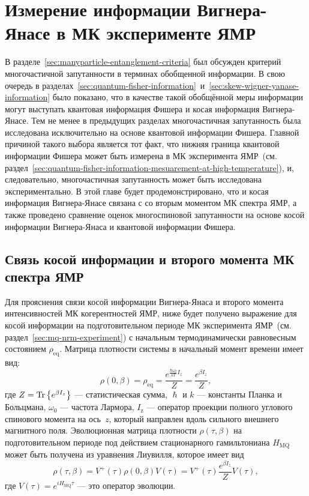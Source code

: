 \chapter{Измерение информации Вигнера-Янасе в МК эксперименте ЯМР}
\label{chapter:wyi-mesuarement}


В разделе~\ref{sec:manyparticle-entanglement-criteria} был обсужден критерий многочастичной запутанности
в терминах обобщенной информации.
В свою очередь в разделах~\ref{sec:quantum-fisher-information}~и~\ref{sec:skew-wigner-yanase-information}
было показано,
что в качестве такой обобщённой меры информации могут выступать
квантовая информация Фишера и косая информация Вигнера-Янасе.
Тем не менее в предыдущих разделах многочастичная запутанность была исследована исключительно
на основе квантовой информации Фишера.
Главной причиной такого выбора является тот факт,
что нижняя граница квантовой информации Фишера может быть измерена в МК эксперимента ЯМР~(см.  раздел~\ref{sec:quantum-fisher-information-mesuarement-at-high-temperature}),
и, следовательно, многочастичная запутанность может быть исследована экспериментально.
В этой главе будет продемонстрировано,
что и косая информация Вигнера-Янасе связана с
со вторым моментом МК спектра ЯМР,
а также проведено сравнение оценок многоспиновой запутанности
на основе косой информации Вигнера-Янаса и квантовой информации Фишера.



\section{Связь косой информации и второго момента МК спектра ЯМР}
\label{sec:wyi-mesuarement}

Для прояснения связи косой информации Вигнера-Янаса и
второго момента интенсивностей МК когерентностей ЯМР,
ниже будет получено выражение для косой информации
на подготовительном периоде МК эксперимента ЯМР~(см. раздел~\ref{sec:mq-nrm-experiment})
с начальным термодинамически равновесным состоянием $\rho_\mathrm{eq}$.
Матрица плотности системы в начальный момент времени имеет вид:
\begin{equation}
  \rho(0, \beta)
  = \rho_\mathrm{eq}
  = \dfrac{e^{\frac{\hbar\omega_{0}}{kT} I_z}}{Z}
  = \dfrac{e^{\beta I_z}}{Z},
\end{equation}
где $Z = \mathrm{Tr} \left\{ e^{\beta I_z} \right\}$ --- статистическая сумма,
$\hslash$ и $k$ --- константы Планка и Больцмана,
$\omega_{0}$ --- частота Лармора,
$I_\mathrm{z}$ ---  оператор проекции полного углового спинового момента  на ось~$z$,
который направлен вдоль сильного внешнего магнитного поля.
Эволюционная матрица плотности $\rho(\tau,\beta)$ на подготовительном периоде
под действием стационарного гамильтониана $H_\mathrm{MQ}$
может быть получена из уравнения Лиувилля,
которое имеет вид
%
\begin{equation}\label{eq:rho-eval}
  \rho(\tau,\beta)
  = V^+(\tau) \rho(0, \beta) V(\tau)
  = V^+(\tau) \frac{e^{\beta I_z}}{Z} V(\tau),
\end{equation}
где $V(\tau) = e^{iH_\mathrm{MQ}\tau}$
--- это оператор эволюции.

